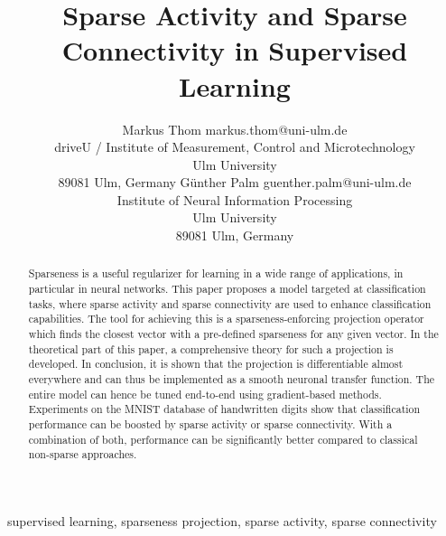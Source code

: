 \documentclass[twoside,11pt]{article}
\newcommand{\0}{\mathcal{O}}
\begin{document}
\title{Sparse Activity and Sparse Connectivity in Supervised Learning}

\author{\name Markus Thom \email markus.thom@uni-ulm.de\\
       \addr driveU / Institute of Measurement, Control and Microtechnology\\
       Ulm University\\
       89081 Ulm, Germany
       \AND
       \name G\"{u}nther Palm \email guenther.palm@uni-ulm.de\\
       \addr Institute of Neural Information Processing\\
       Ulm University\\
       89081 Ulm, Germany}


\maketitle

\begin{abstract}Sparseness is a useful regularizer for learning in a wide range of applications, in particular in neural networks.
This paper proposes a model targeted at classification tasks, where sparse activity and sparse connectivity are used to enhance classification capabilities.
The tool for achieving this is a sparseness-enforcing projection operator which finds the closest vector with a pre-defined sparseness for any given vector.
In the theoretical part of this paper, a comprehensive theory for such a projection is developed.
In conclusion, it is shown that the projection is differentiable almost everywhere and can thus be implemented as a smooth neuronal transfer function.
The entire model can hence be tuned end-to-end using gradient-based methods.
Experiments on the MNIST database of handwritten digits show that classification performance can be boosted by sparse activity or sparse connectivity.
With a combination of both, performance can be significantly better compared to classical non-sparse approaches.
\end{abstract}

\begin{keywords}
supervised learning, sparseness projection, sparse activity, sparse connectivity
\end{keywords}
\end{document}
